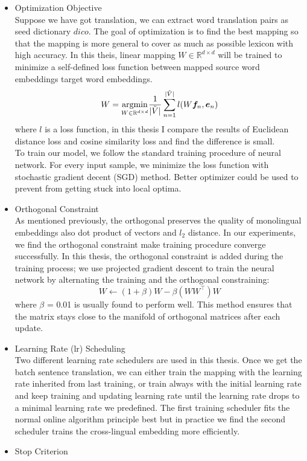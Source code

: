 \begin{itemize}
	
	\item Optimization Objective \\
	Suppose we have got translation, we can extract word translation pairs as seed dictionary $dico$. The goal of optimization is to find the best mapping so that the mapping is more general to cover as much as possible lexicon with high accuracy. In this theis, linear mapping $W \in \mathbb{R}^{d \times d}$ will be trained to minimize a self-defined loss function between mapped  source word embeddings target word embeddings.
	\[ W = \underset{W \in \mathbb{R}^{d \times d}}{\operatorname{argmin}} \frac{1}{{\lvert \tilde{V} \rvert}} \sum_{n=1}^{\lvert \tilde{V} \rvert} l(W\bm{f}_n, \bm{e}_n) \]
	where $l$ is a loss function, in this thesis I compare the results of Euclidean distance loss and cosine similarity loss and find the difference is small.\\
	To train our model, we follow the standard training procedure of neural network. For every input sample, we minimize the loss function with stochastic gradient decent (SGD) method. Better optimizer could be used to prevent from getting stuck into local optima.
	\item Orthogonal Constraint\\
	As mentioned previously, the orthogonal preserves the quality of monolingual embeddings also dot product of vectors and  $l_2$ distance. In our experiments, we find the orthogonal constraint make training procedure converge successfully. In this thesis, the orthogonal constraint is added during the training process; we use projected gradient descent to train the neural network by alternating the training and the orthogonal constraining:
\[ W \leftarrow (1+\beta) W - \beta(WW^\top)W\] 
	where $\beta$ = 0.01  is usually found to perform well.  This method ensures that the matrix stays close to the manifold of orthogonal matrices after each update. 	
	\item Learning Rate (lr) Scheduling\\
	Two different learning rate schedulers are used in this thesis. Once we get the batch sentence translation, we can either train the mapping with the learning rate inherited from last training, or train always with the initial learning rate and keep training and updating learning rate until the learning rate drops to a minimal learning rate we predefined. The first training scheduler fits the normal online algorithm principle best but in practice we find the second scheduler trains the cross-lingual embedding more efficiently.
	\item Stop Criterion\\

\end{itemize}
